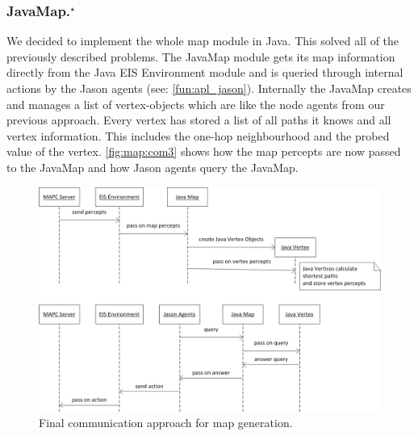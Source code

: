 \subsubsection[JavaMap]{JavaMap.$^\star$}\label{alg:map_javamap}
We decided to implement the whole map module in Java.
This solved all of the previously described problems.
The JavaMap module gets its map information directly from the Java EIS Environment module and is queried through internal actions by the Jason agents (see: \autoref{fun:apl_jason}).
Internally the JavaMap creates and manages a list of vertex-objects which are like the node agents from our previous approach.
Every vertex has stored a list of all paths it knows and all vertex information.
This includes the one-hop neighbourhood and the probed value of the vertex.
\autoref{fig:map:com3} shows how the map percepts are now passed to the JavaMap and how Jason agents query the JavaMap.
\begin{figure}
  \centering
  \includegraphics[width=\linewidth]{images/map_com_3.png}
  \caption{Final communication approach for map generation.}
  \label{fig:map:com3}
\end{figure}

